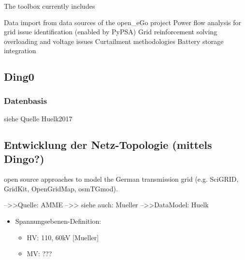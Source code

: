 \documentclass[
a4paper,     %
12pt         %
]{scrartcl}  %
\begin{document}
The toolbox currently includes

Data import from data sources of the open\_eGo project
Power flow analysis for grid issue identification (enabled by PyPSA)
Grid reinforcement solving overloading and voltage issues
Curtailment methodologies
Battery storage integration


\subsection{Ding0}
\subsubsection{Datenbasis}
siehe Quelle Huelk2017
\subsection{Entwicklung der Netz-Topologie (mittels Dingo?)}
\label{netz-topo_dingo}
open source approaches to model
the German transmission grid (e.g. SciGRID, GridKit, OpenGridMap, osmTGmod).

-->>Quelle: AMME
-->> siehe auch: Mueller
-->>DataModel: Huelk
\begin{itemize}
	\item[] Spannungsebenen-Definition:
	\begin{itemize}
		\item HV: 110, 60kV [Mueller]
		\item MV: ???
	\end{itemize}

\end{itemize}
\end{document}
